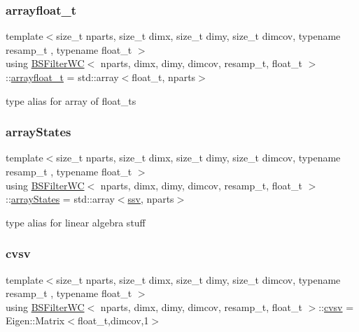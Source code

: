 \subsubsection{\texorpdfstring{arrayfloat\+\_\+t}{arrayfloat\_t}}
{\footnotesize\ttfamily template$<$size\+\_\+t nparts, size\+\_\+t dimx, size\+\_\+t dimy, size\+\_\+t dimcov, typename resamp\+\_\+t , typename float\+\_\+t $>$ \\
using \hyperlink{classBSFilterWC}{B\+S\+Filter\+WC}$<$ nparts, dimx, dimy, dimcov, resamp\+\_\+t, float\+\_\+t $>$\+::\hyperlink{classBSFilterWC_a12c3f32cb628a0efaa0267262205d6d6}{arrayfloat\+\_\+t} =  std\+::array$<$float\+\_\+t, nparts$>$}

type alias for array of float\+\_\+ts \mbox{\label{classBSFilterWC_af89dac8c324ae8b549595a85e89ec7da}} 
\subsubsection{\texorpdfstring{array\+States}{arrayStates}}
{\footnotesize\ttfamily template$<$size\+\_\+t nparts, size\+\_\+t dimx, size\+\_\+t dimy, size\+\_\+t dimcov, typename resamp\+\_\+t , typename float\+\_\+t $>$ \\
using \hyperlink{classBSFilterWC}{B\+S\+Filter\+WC}$<$ nparts, dimx, dimy, dimcov, resamp\+\_\+t, float\+\_\+t $>$\+::\hyperlink{classBSFilterWC_af89dac8c324ae8b549595a85e89ec7da}{array\+States} =  std\+::array$<$\hyperlink{classBSFilterWC_afff292a8cc15505cc3aa244135203c78}{ssv}, nparts$>$}

type alias for linear algebra stuff \mbox{\label{classBSFilterWC_a52f5a46901a821fffe82937543220a1a}} 
\subsubsection{\texorpdfstring{cvsv}{cvsv}}
{\footnotesize\ttfamily template$<$size\+\_\+t nparts, size\+\_\+t dimx, size\+\_\+t dimy, size\+\_\+t dimcov, typename resamp\+\_\+t , typename float\+\_\+t $>$ \\
using \hyperlink{classBSFilterWC}{B\+S\+Filter\+WC}$<$ nparts, dimx, dimy, dimcov, resamp\+\_\+t, float\+\_\+t $>$\+::\hyperlink{classBSFilterWC_a52f5a46901a821fffe82937543220a1a}{cvsv} =  Eigen\+::\+Matrix$<$float\+\_\+t,dimcov,1$>$}

